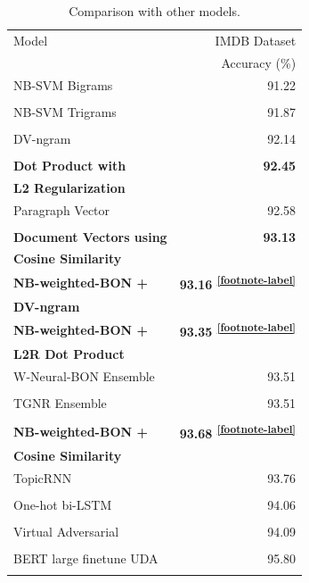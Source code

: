 \documentclass[11pt,a4paper]{article}
\begin{document}
\begin{table}[h]
	\centering
	\small
	\begin{tabular}{@{\hskip6pt}lr@{\hskip6pt}}
		\toprule
		Model & IMDB Dataset \\ 
		 & Accuracy (\%)\\
		\midrule
		NB-SVM Bigrams & 91.22  \\
		 \cite{wang2012}	& \\
		NB-SVM Trigrams & 91.87 \\
		\cite{mesnil2015} & \\
		DV-ngram  & 92.14 \\
		\cite{li2016a} & \\
		\bf{Dot Product with} & \bf{92.45} \\
		\bf{L2 Regularization} & \\ 
		Paragraph Vector & 92.58 \\
		\cite{le2014} & \\
		\bf{Document Vectors using} & \bf{93.13} \\
		\bf{Cosine Similarity} & \\
		\bf{NB-weighted-BON +} & \bf{93.16} \textsuperscript{\ref{footnote-label}} \\
		\bf{DV-ngram} & \\
		\bf{NB-weighted-BON +} & \bf{93.35} \textsuperscript{\ref{footnote-label}} \\
		\bf{L2R Dot Product} & \\
		W-Neural-BON Ensemble & 93.51 \\
		\cite{li2016b} & \\
		TGNR Ensemble & 93.51 \\
		\cite{li2017} & \\
		\bf{NB-weighted-BON +} & \bf{93.68} \textsuperscript{\ref{footnote-label}} \\
		\bf{Cosine Similarity} & \\
		TopicRNN & 93.76 \\
		\cite{dieng2017} & \\
		One-hot bi-LSTM & 94.06 \\
		\cite{johnson2016} \\
		Virtual Adversarial & 94.09 \\
		\cite{miyato2016} & \\
		BERT large finetune UDA & 95.80\\
		\cite{xie2019} & \\
		\bottomrule
	\end{tabular}
	\caption{Comparison with other models.}
	\label{mc}
\end{table}
\end{document}
